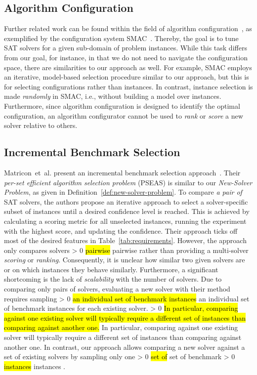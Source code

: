 \documentclass[sn-basic, Numbered]{sn-jnl} %
\newcommand{\showchanges}{1} %
\newcommand{\change}[1]{\ifnum \showchanges > 0 \sethlcolor{yellow}\hl{#1} \else #1 \fi}
\begin{document}
\subsection{Algorithm Configuration}
\label{sec:related:algo-configuration}

Further related work can be found within the field of algorithm configuration~\cite{HoosHL21,Stutzle0P22}, as exemplified by the configuration system SMAC~\cite{HutterHL11}.
Thereby, the goal is to tune SAT solvers for a given sub-domain of problem instances.
While this task differs from our goal, for instance, in that we do not need to navigate the configuration space, there are similarities to our approach as well.
For example, SMAC employs an iterative, model-based selection procedure similar to our approach, but this is for selecting configurations rather than instances.
In contrast, instance selection is made \emph{randomly} in SMAC, i.e., without building a model over instances.
Furthermore, since algorithm configuration is designed to identify the optimal configuration, an algorithm configurator cannot be used to \emph{rank} or \emph{score} a new solver relative to others.

\subsection{Incremental Benchmark Selection}
\label{sec:related:incremental-selection}

Matricon~et~al. present an incremental benchmark selection approach~\cite{MatriconAFSH21}.
Their \emph{per-set efficient algorithm selection problem} (PSEAS) is similar to our \emph{New-Solver Problem}, as given in Definition~\ref{def:new-solver-problem}.
To compare \emph{a pair of} SAT solvers, the authors propose an iterative approach to select a solver-specific subset of instances until a desired confidence level is reached.
This is achieved by calculating a scoring metric for all unselected instances, running the experiment with the highest score, and updating the confidence.
Their approach ticks off most of the desired features in Table~\ref{tab:requirements}.
However, the approach only compares solvers \change{pairwise} rather than providing a multi-solver \emph{scoring} or \emph{ranking}.
Consequently, it is unclear how similar two given solvers are or on which instances they behave similarly.
Furthermore, a significant shortcoming is the lack of \emph{scalability} with the number of solvers.
Due to comparing only pairs of solvers, evaluating a new solver with their method requires sampling \change{an individual set of benchmark instances} for each existing solver.
\change{In particular, comparing against one existing solver will typically require a different set of instances than comparing against another one.}
In contrast, our approach allows comparing a new solver against a set of existing solvers by sampling only one \change{set of} benchmark \change{instances}.
\end{document}

